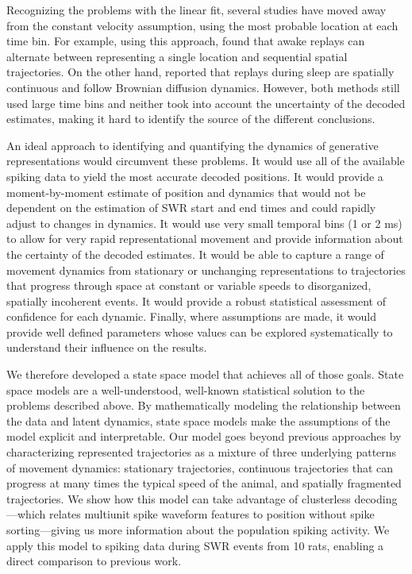 \documentclass[9pt,lineno]{elife}
\begin{document}
Recognizing the problems with the linear fit, several studies have moved away from the constant velocity assumption, using the most probable location at each time bin. For example, using this approach, \cite{PfeifferAutoassociativedynamicsgeneration2015} found that awake replays can alternate between representing a single location and sequential spatial trajectories. On the other hand, \cite{StellaHippocampalReactivationRandom2019} reported that replays during sleep are spatially continuous and follow Brownian diffusion dynamics. However, both methods still used large time bins and neither took into account the uncertainty of the decoded estimates, making it hard to identify the source of the different conclusions.

An ideal approach to identifying and quantifying the dynamics of generative representations would circumvent these problems. It would use all of the available spiking data to yield the most accurate decoded positions. It would provide a moment-by-moment estimate of position and dynamics that would not be dependent on the estimation of SWR start and end times and could rapidly adjust to changes in dynamics. It would use very small temporal bins (1 or 2 ms) to allow for very rapid representational movement and provide information about the certainty of the decoded estimates. It would be able to capture a range of movement dynamics from stationary or unchanging representations to trajectories that progress through space at constant or variable speeds to disorganized, spatially incoherent events. It would provide a robust statistical assessment of confidence for each dynamic. Finally, where assumptions are made, it would provide well defined parameters whose values can be explored systematically to understand their influence on the results.

We therefore developed a state space model that achieves all of those goals. State space models are a well-understood, well-known statistical solution to the problems described above. By mathematically modeling the relationship between the data and latent dynamics, state space models make the assumptions of the model explicit and interpretable. Our model goes beyond previous approaches \citep{MaboudiUncoveringtemporalstructure2018, DengRapidclassificationhippocampal2016} by characterizing represented trajectories as a mixture of three underlying patterns of movement dynamics: stationary trajectories, continuous trajectories that can progress at many times the typical speed of the animal, and spatially fragmented trajectories. We show how this model can take advantage of clusterless decoding---which relates multiunit spike waveform features to position without spike sorting---giving us more information about the population spiking activity. We apply this model to spiking data during SWR events from 10 rats, enabling a direct comparison to previous work.
\end{document}
